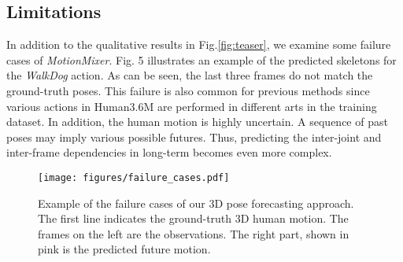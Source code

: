 \documentclass{article}
\begin{document}
\begin{table}[h]

	\centering
	\small
	\tabcolsep=1mm
	\caption{Computational complexity analysis. ($\dagger$) indicates results with the average error over all frames. }
	\label{tbl:complexity}
\end{table}

 \subsection{Limitations}
 
In addition to the qualitative results in Fig.\ref{fig:teaser}, we examine some failure cases of \textit{MotionMixer}. Fig. 5 illustrates an example of the predicted skeletons for the \textit{WalkDog} action. As can be seen, the last three frames do not match the ground-truth poses. This failure is also common for previous methods \cite{mao2021multi,sofianos2021space} since various actions in Human3.6M are performed in different arts in the training dataset. In addition, the human motion is highly uncertain. A sequence of past poses may imply various possible futures. Thus, predicting the inter-joint and inter-frame dependencies in long-term becomes even more complex.




\begin{figure} [htp!]
    \centering
    \vspace{-0.1in}
    \texttt{[image: figures/failure\_cases.pdf]}
    \caption{Example of the failure cases of our 3D pose forecasting approach. The first line indicates the ground-truth 3D human motion.  The frames on the left are the observations. The right part, shown in pink is the predicted future motion.}
   \label{fig:failures}
\end{figure}
\end{document}

